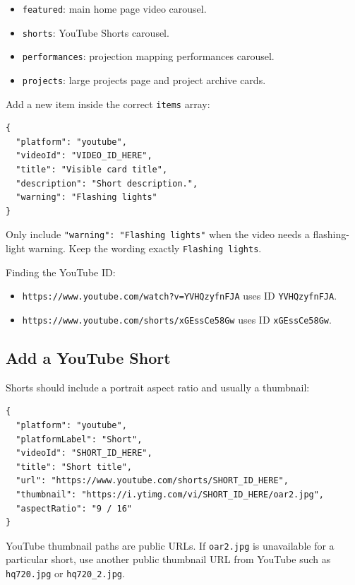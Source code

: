 \documentclass[11pt]{article}
\begin{document}
\begin{itemize}
  \item \texttt{featured}: main home page video carousel.
  \item \texttt{shorts}: YouTube Shorts carousel.
  \item \texttt{performances}: projection mapping performances carousel.
  \item \texttt{projects}: large projects page and project archive cards.
\end{itemize}

Add a new item inside the correct \texttt{items} array:

\begin{lstlisting}
{
  "platform": "youtube",
  "videoId": "VIDEO_ID_HERE",
  "title": "Visible card title",
  "description": "Short description.",
  "warning": "Flashing lights"
}
\end{lstlisting}

Only include \texttt{"warning": "Flashing lights"} when the video needs a flashing-light warning. Keep the wording exactly \texttt{Flashing lights}.

Finding the YouTube ID:

\begin{itemize}
  \item \texttt{https://www.youtube.com/watch?v=YVHQzyfnFJA} uses ID \texttt{YVHQzyfnFJA}.
  \item \texttt{https://www.youtube.com/shorts/xGEssCe58Gw} uses ID \texttt{xGEssCe58Gw}.
\end{itemize}

\subsection{Add a YouTube Short}

Shorts should include a portrait aspect ratio and usually a thumbnail:

\begin{lstlisting}
{
  "platform": "youtube",
  "platformLabel": "Short",
  "videoId": "SHORT_ID_HERE",
  "title": "Short title",
  "url": "https://www.youtube.com/shorts/SHORT_ID_HERE",
  "thumbnail": "https://i.ytimg.com/vi/SHORT_ID_HERE/oar2.jpg",
  "aspectRatio": "9 / 16"
}
\end{lstlisting}

YouTube thumbnail paths are public URLs. If \texttt{oar2.jpg} is unavailable for a particular short, use another public thumbnail URL from YouTube such as \texttt{hq720.jpg} or \texttt{hq720\_2.jpg}.
\end{document}
